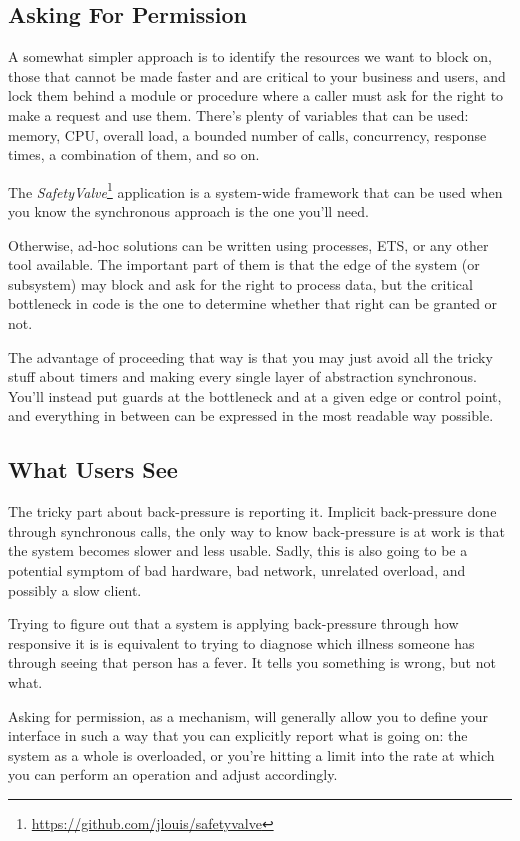\documentclass[11pt, oneside]{book}   	%
\begin{document}
\subsection{Asking For Permission}

A somewhat simpler approach is to identify the resources we want to block on, those that cannot be made faster and are critical to your business and users, and lock them behind a module or procedure where a caller must ask for the right to make a request and use them. There's plenty of variables that can be used: memory, CPU, overall load, a bounded number of calls, concurrency, response times, a combination of them, and so on.

The \emph{SafetyValve}\footnote{\href{https://github.com/jlouis/safetyvalve}{https://github.com/jlouis/safetyvalve}} application is a system-wide framework that can be used when you know the synchronous approach is the one you'll need.

Otherwise, ad-hoc solutions can be written using processes, ETS, or any other tool available. The important part of them is that the edge of the system (or subsystem) may block and ask for the right to process data, but the critical bottleneck in code is the one to determine whether that right can be granted or not.

The advantage of proceeding that way is that you may just avoid all the tricky stuff about timers and making every single layer of abstraction synchronous. You'll instead put guards at the bottleneck and at a given edge or control point, and everything in between can be expressed in the most readable way possible.

\subsection{What Users See}
 
The tricky part about back-pressure is reporting it. Implicit back-pressure done through synchronous calls, the only way to know back-pressure is at work is that the system becomes slower and less usable. Sadly, this is also going to be a potential symptom of bad hardware, bad network, unrelated overload, and possibly a slow client.

Trying to figure out that a system is applying back-pressure through how responsive it is is equivalent to trying to diagnose which illness someone has through seeing that person has a fever. It tells you something is wrong, but not what.

Asking for permission, as a mechanism, will generally allow you to define your interface in such a way that you can explicitly report what is going on: the system as a whole is overloaded, or you're hitting a limit into the rate at which you can perform an operation and adjust accordingly.
\end{document}
